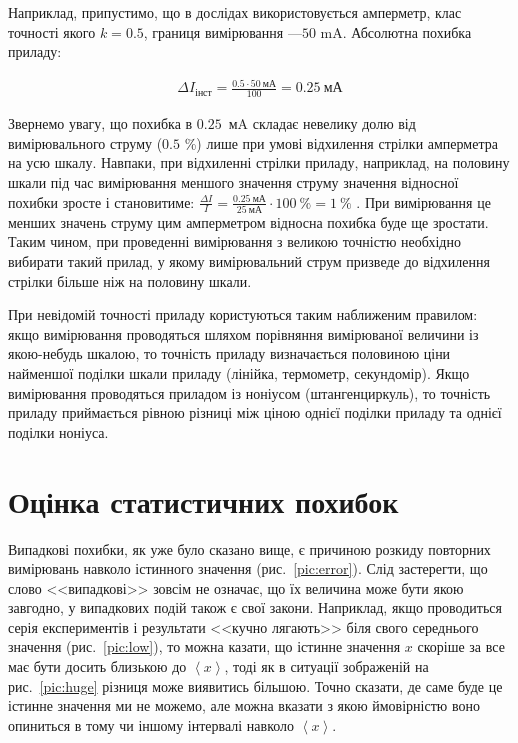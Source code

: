 \documentclass{LabBook}
\begin{document}
    Наприклад, припустимо, що в дослідах використовується амперметр, клас точності якого  $k = 0.5$, границя вимірювання ---$  50 $ mA. Абсолютна похибка приладу:

    \begin{align*}
      \Delta I_\text{інст} =  \frac{0.5 \cdot 50 \ \text{мА}}{100}=0.25\ \text{мА}
    \end{align*}


    \begin{Warning}
      Звернемо увагу, що похибка в $ 0.25 $~мA складає невелику долю від вимірювального струму ($ 0.5 $ \%) лише при умові відхилення стрілки амперметра на усю шкалу. Навпаки, при відхиленні стрілки приладу, наприклад, на половину шкали під час вимірювання меншого значення струму значення відносної похибки зросте і становитиме: $\frac{{\Delta I}}{I} = \frac{0.25\ \text{мА}}{25\ \text{мА}} \cdot 100 \ \%  = 1\ \% $ . При вимірювання це менших значень струму цим амперметром відносна похибка буде ще зростати. Таким чином, при проведенні вимірювання з великою точністю необхідно вибирати такий прилад, у якому вимірювальний струм призведе до відхилення стрілки більше ніж на половину шкали.
    \end{Warning}


    При невідомій точності приладу користуються таким наближеним правилом: якщо вимірювання проводяться шляхом порівняння вимірюваної величини із якою-небудь шкалою, то точність приладу визначається половиною ціни найменшої поділки шкали приладу (лінійка, термометр, секундомір). Якщо вимірювання проводяться приладом із ноніусом (штангенциркуль), то точність приладу приймається рівною різниці між ціною однієї поділки приладу та однієї поділки ноніуса.



\section{Оцінка статистичних похибок}


  Випадкові похибки, як уже було сказано вище, є причиною розкиду повторних вимірювань навколо істинного значення (рис.~\ref{pic:error}). Слід застерегти, що слово <<випадкові>> зовсім не означає, що  їх величина може бути якою завгодно, у випадкових подій також є свої закони. Наприклад, якщо прово\-дить\-ся серія експериментів і результати <<кучно лягають>> біля свого середнього значення (рис.~\ref{pic:low}), то можна казати, що істинне значення $x$ скоріше за все має бути досить близькою до  $\left\langle x \right\rangle$, тоді як в ситуації зображеній на рис.~\ref{pic:huge} різниця може виявитись більшою. Точно сказати, де саме буде це істинне значення ми не можемо, але можна вказати з якою ймовірністю воно опиниться в тому чи іншому інтервалі навколо $\left\langle x \right\rangle$.
\end{document}
